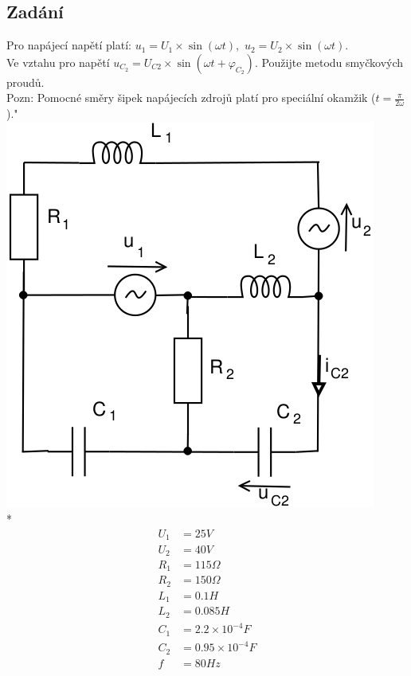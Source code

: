 \documentclass[a4paper, 10pt, fleqn]{article}
\begin{document}
\subsection*{Zadání}
Pro napájecí napětí platí: $u_{1} = U_{1} \times \sin(\omega t),$
$u_{2} = U_{2} \times \sin(\omega t)$. \\
Ve vztahu pro napětí $u_{C_{2}} =U_{C2} \times \sin (\omega t + \varphi_{C_{2}})$.
Použijte metodu smyčkových proudů.\\[0.8cm]
Pozn: Pomocné směry šipek napájecích zdrojů platí pro speciální okamžik
($t = \frac{\pi}{2\omega}$)."\\
\includegraphics[scale=0.5]{IEL_OBR/4.png}\\*
\begin{align*}
 U_{1} &= 25 V \\
 U_{2} &= 40 V \\
 R_{1} &= 115 \Omega \\
 R_{2} &= 150 \Omega \\
 L_{1} &= 0.1 H \\
 L_{2} &= 0.085 H\\
 C_{1} &= 2.2 \times 10^{-4} F \\
 C_{2} &= 0.95 \times 10^{-4} F \\
 f &= 80 Hz \\
\end{align*}
\newpage
\end{document}

